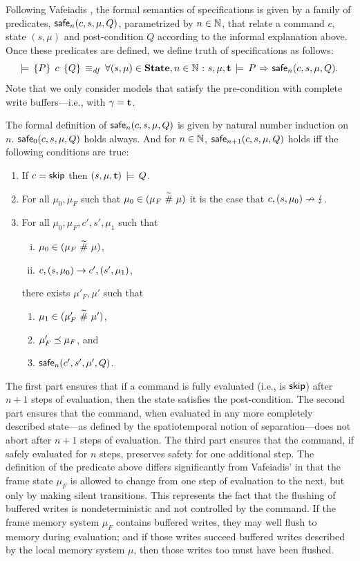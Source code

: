 \documentclass[11pt]{report}         %
\begin{document}
Following Vafeiadis \cite{V11}, the formal semantics of specifications is given by a family of predicates, $\mathsf{safe}_{n}(c,s,\mu,Q)$, parametrized by $n \in \mathbb{N}$, that relate a command $c$, state $(s,\mu)$ and post-condition $Q$ according to the informal explanation above. Once these predicates are defined, we define truth of specifications as follows: \[ \models\,\left\lbrace P \right\rbrace\;c\;\left\lbrace Q \right\rbrace \operatorname{\;\equiv_{\mathit{df}}\;} \forall (s,\mu) \in \mathbf{State}, n \in \mathbb{N} \operatorname{\,:\,} s,\mu,\mathbf{t} \,\models\, P \operatorname{\,\Rightarrow\,} \mathsf{safe}_{n}(c,s,\mu,Q).\]
Note that we only consider models that satisfy the pre-condition with complete write buffers---i.e., with $\gamma = \mathbf{t}$. 


The formal definition of $\mathsf{safe}_{n}(c,s,\mu,Q)$ is given by natural number induction on $n$. $\mathsf{safe}_{0}(c,s,\mu,Q)$ holds always. And for $n \in \mathbb{N}$, $\mathsf{safe}_{n+1}(c,s,\mu,Q)$ holds iff the following conditions are true: \begin{enumerate}
    \item If $c = \operatorname{\mathsf{skip}}$ then $(s,\mu,\mathbf{t}) \,\models\, Q$.

    \item For all $\mu_0,\mu_F$ such that $\mu_0 \in (\mu_F \operatorname{\,\widetilde{\#}\,} \mu)$ it is the case that $c,(s,\mu_0) \nrightarrow \lightning$.

    \item For all $\mu_0,\mu_F,c',s',\mu_1$ such that \begin{enumerate}[(i)]
        \item $\mu_0 \in (\mu_F \operatorname{\,\widetilde{\#}\,} \mu)$,
        \item $c,(s,\mu_0) \rightarrow c',(s',\mu_1)$,
    \end{enumerate} there exists $\mu'_F,\mu'$ such that \begin{enumerate}
        \item $\mu_1 \in (\mu'_F \operatorname{\,\widetilde{\#}\,} \mu')$,
        \item $\mu'_F \preceq \mu_F$, and
        \item $\mathsf{safe}_{n}(c',s',\mu',Q)$.
    \end{enumerate}

\end{enumerate}

The first part ensures that if a command is fully evaluated (i.e., is $\operatorname{\mathsf{skip}}$) after $n+1$ steps of evaluation, then the state satisfies the post-condition. The second part ensures that the command, when evaluated in any more completely described state---as defined by the spatiotemporal notion of separation---does not abort after $n+1$ steps of evaluation. The third part ensures that the command, if safely evaluated for $n$ steps, preserves safety for one additional step. The definition of the predicate above differs significantly from Vafeiadis' in that the frame state $\mu_F$ is allowed to change from one step of evaluation to the next, but only by making silent transitions. This represents the fact that the flushing of buffered writes is nondeterministic and not controlled by the command. If the frame memory system $\mu_F$ contains buffered writes, they may well flush to memory during evaluation; and if those writes succeed buffered writes described by the local memory system $\mu$, then those writes too must have been flushed. 
\end{document}
